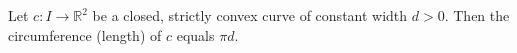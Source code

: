Let $c: I \to \mathbb{R}^2$ be a closed, strictly convex curve of constant width $d > 0$. Then the circumference (length) of $c$ equals $\pi d$.
